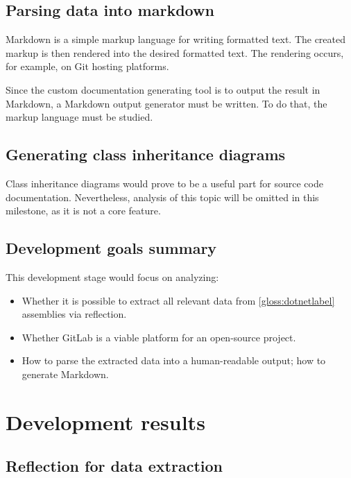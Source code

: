\subsection{Parsing data into markdown}
Markdown is a simple markup language for writing formatted text. The created markup is then rendered into the desired formatted text. The rendering occurs, for example, on Git hosting platforms.

Since the custom documentation generating tool is to output the result in Markdown, a Markdown output generator must be written. To do that, the markup language must be studied.

\subsection{Generating class inheritance diagrams}
Class inheritance diagrams would prove to be a useful part for source code documentation. Nevertheless, analysis of this topic will be omitted in this milestone, as it is not a core feature.

\subsection{Development goals summary}
This development stage would focus on analyzing:
\begin{itemize}
    \item Whether it is possible to extract all relevant data from \ref{gloss:dotnetlabel} assemblies via reflection.
    \item Whether GitLab is a viable platform for an open-source project.
    \item How to parse the extracted data into a human-readable output; how to generate Markdown.
\end{itemize}

\section{Development results}

\subsection{Reflection for data extraction}

